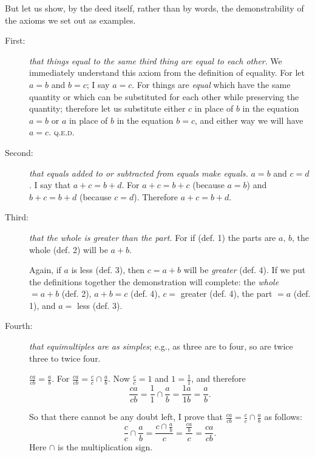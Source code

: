 \documentclass[twoside,openright]{article}
\begin{document}
But let us show, by the deed itself, rather than by words, the demonstrability
of the axioms we set out as examples.
\begin{description}
\item[First:] {\em that things equal to the same third thing are equal to each
other}.  We immediately understand this axiom from the definition of equality.
For let $a=b$ and $b=c$; I say $a=c$.  For things are {\em equal} which have
the same quantity or which can be substituted for each other while preserving
the quantity; therefore let us substitute either $c$ in place of $b$ in the
equation $a=b$ or $a$ in place of $b$ in the equation $b=c$, and either way we
will have $a=c$.  \textsc{q.e.d.}
\item[Second:] {\em that equals added to or subtracted from equals make
equals.}  $a=b$ and $c=d$. I say that $a+c= b+d$.  For $a+c = b+c$ (because
$a=b$) and $b+c = b+d$ (because $c=d$). Therefore $a+c = b+d$.
\item[Third:] {\em that the whole is greater than the part.}  For if (def. 1)
the parts are $a$, $b$, the whole (def. 2) will be $a+b$.
\begin{center}
\end{center}
Again, if $a$ is less (def. 3), then $c=a+b$ will be {\em greater} (def. 4).
If we put the definitions together the demonstration will complete: the
{\em whole} $= a + b$ (def. 2), $a + b = c$ (def. 4), $c =$ greater (def. 4),
the part $= a$ (def. 1), and $a = $ less (def. 3).

\item[Fourth:] {\em that equimultiples are as simples}; e.g., as three are to
four, so are twice three to twice four.

$\frac{ca}{cb} =\frac{a}{b}$. For $\frac{ca}{cb} = \frac{c}{c} \cap
\frac{a}{b}$.  Now $\frac{c}{c} = 1$ and $1 = \frac{1}{1}$, and therefore
$$\frac{ca}{cb} = \frac{1}{1} \cap \frac{a}{b} = \frac{1a}{1b} =
\frac{a}{b}.$$

So that there cannot be any doubt left, I prove that $\frac{ca}{cb} =
 \frac{c}{c} \cap \frac{a}{b}$ as follows:
$$\frac{c}{c} \cap \frac{a}{b} = \frac{c \cap \frac{a}{b}}{c} =
\frac{\frac{ca}{b}}{c} = \frac{ca}{cb}.$$ Here $\cap$ is the multiplication
sign.


\end{description}
\end{document}
